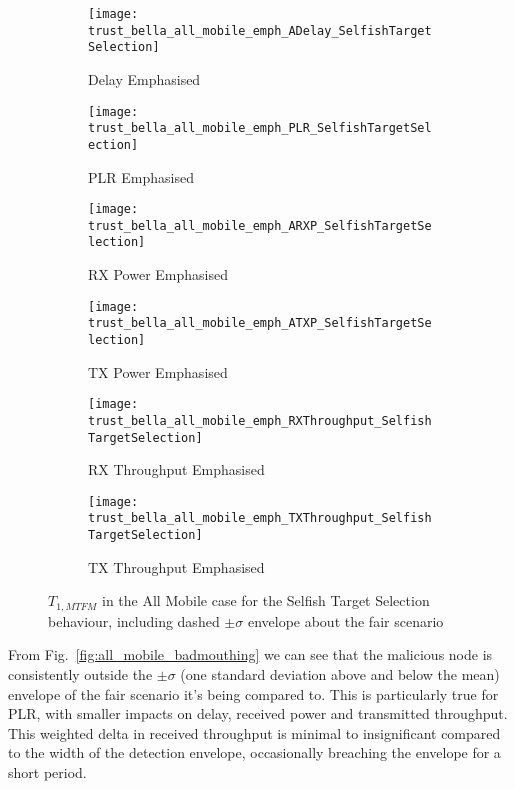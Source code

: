 \begin{figure}[h]
  \centering
  \begin{subfigure}{0.45\textwidth}	
    \texttt{[image: trust\_bella\_all\_mobile\_emph\_ADelay\_SelfishTargetSelection]} 
    \caption{Delay Emphasised}
    \label{fig:all_mobile_selfish_delay}
  \end{subfigure}
  \begin{subfigure}{0.45\textwidth}	
    \texttt{[image: trust\_bella\_all\_mobile\_emph\_PLR\_SelfishTargetSelection]}
    \caption{PLR Emphasised}
    \label{fig:all_mobile_selfish_plr}
  \end{subfigure}

  \begin{subfigure}{0.45\textwidth}	
    \texttt{[image: trust\_bella\_all\_mobile\_emph\_ARXP\_SelfishTargetSelection]}
    \caption{RX Power Emphasised}
    \label{fig:all_mobile_selfish_rxp}
  \end{subfigure}
  \begin{subfigure}{0.45\textwidth}
    \texttt{[image: trust\_bella\_all\_mobile\_emph\_ATXP\_SelfishTargetSelection]}
    \caption{TX Power Emphasised}
    \label{fig:all_mobile_selfish_txp}
  \end{subfigure}

  \begin{subfigure}{0.45\textwidth}
    \texttt{[image: trust\_bella\_all\_mobile\_emph\_RXThroughput\_SelfishTargetSelection]} 
    \caption{RX Throughput Emphasised}
    \label{fig:all_mobile_selfish_rxthroughput}
  \end{subfigure}
  \begin{subfigure}{0.45\textwidth}
    \texttt{[image: trust\_bella\_all\_mobile\_emph\_TXThroughput\_SelfishTargetSelection]} 
    \caption{TX Throughput Emphasised}
    \label{fig:all_mobile_selfish_txthroughput}
  \end{subfigure}
  \caption{$T_{1,MTFM}$ in the All Mobile case for the Selfish Target Selection behaviour, including dashed $\pm\sigma$ envelope about the fair scenario}
  \label{fig:all_mobile_selfish}
\end{figure}

From Fig.~\ref{fig:all_mobile_badmouthing} we can see that the malicious node is consistently outside the $\pm\sigma$ (one standard deviation above and below the mean) envelope of the fair scenario it's being compared to.
This is particularly true for PLR, with smaller impacts on delay, received power and transmitted throughput. 
This weighted delta in received throughput is minimal to insignificant compared to the width of the detection envelope, occasionally breaching the envelope for a short period. 

